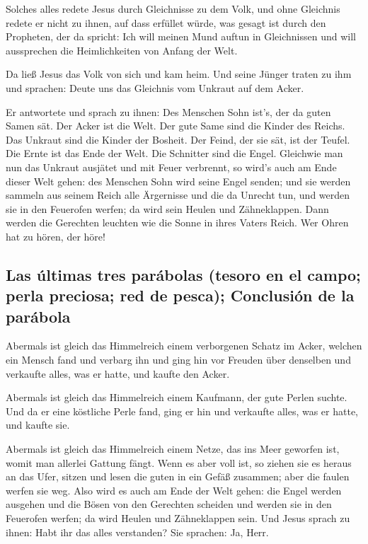  Solches alles redete Jesus durch Gleichnisse zu dem
Volk, und ohne Gleichnis redete er nicht zu ihnen,  auf
dass erfüllet würde, was gesagt ist durch den Propheten, der da spricht:
Ich will meinen Mund auftun in Gleichnissen und will aussprechen die
Heimlichkeiten von Anfang der Welt.

 Da ließ Jesus das Volk von sich und kam heim. Und seine
Jünger traten zu ihm und sprachen: Deute uns das Gleichnis vom Unkraut
auf dem Acker.

 Er antwortete und sprach zu ihnen: Des Menschen Sohn
ist's, der da guten Samen sät.  Der Acker ist die Welt.
Der gute Same sind die Kinder des Reichs. Das Unkraut sind die Kinder
der Bosheit.  Der Feind, der sie sät, ist der Teufel. Die
Ernte ist das Ende der Welt. Die Schnitter sind die Engel.
 Gleichwie man nun das Unkraut ausjätet und mit Feuer
verbrennt, so wird's auch am Ende dieser Welt gehen:  des
Menschen Sohn wird seine Engel senden; und sie werden sammeln aus seinem
Reich alle Ärgernisse und die da Unrecht tun,  und werden
sie in den Feuerofen werfen; da wird sein Heulen und Zähneklappen.
 Dann werden die Gerechten leuchten wie die Sonne in
ihres Vaters Reich. Wer Ohren hat zu hören, der höre!

\hypertarget{las-uxfaltimas-tres-paruxe1bolas-tesoro-en-el-campo-perla-preciosa-red-de-pesca-conclusiuxf3n-de-la-paruxe1bola}{%
\subsection{Las últimas tres parábolas (tesoro en el campo; perla
preciosa; red de pesca); Conclusión de la
parábola}\label{las-uxfaltimas-tres-paruxe1bolas-tesoro-en-el-campo-perla-preciosa-red-de-pesca-conclusiuxf3n-de-la-paruxe1bola}}

 Abermals ist gleich das Himmelreich einem verborgenen
Schatz im Acker, welchen ein Mensch fand und verbarg ihn und ging hin
vor Freuden über denselben und verkaufte alles, was er hatte, und kaufte
den Acker.

 Abermals ist gleich das Himmelreich einem Kaufmann, der
gute Perlen suchte.  Und da er eine köstliche Perle fand,
ging er hin und verkaufte alles, was er hatte, und kaufte sie.

 Abermals ist gleich das Himmelreich einem Netze, das ins
Meer geworfen ist, womit man allerlei Gattung fängt. 
Wenn es aber voll ist, so ziehen sie es heraus an das Ufer, sitzen und
lesen die guten in ein Gefäß zusammen; aber die faulen werfen sie weg.
 Also wird es auch am Ende der Welt gehen: die Engel
werden ausgehen und die Bösen von den Gerechten scheiden 
und werden sie in den Feuerofen werfen; da wird Heulen und Zähneklappen
sein.  Und Jesus sprach zu ihnen: Habt ihr das alles
verstanden? Sie sprachen: Ja, Herr.

